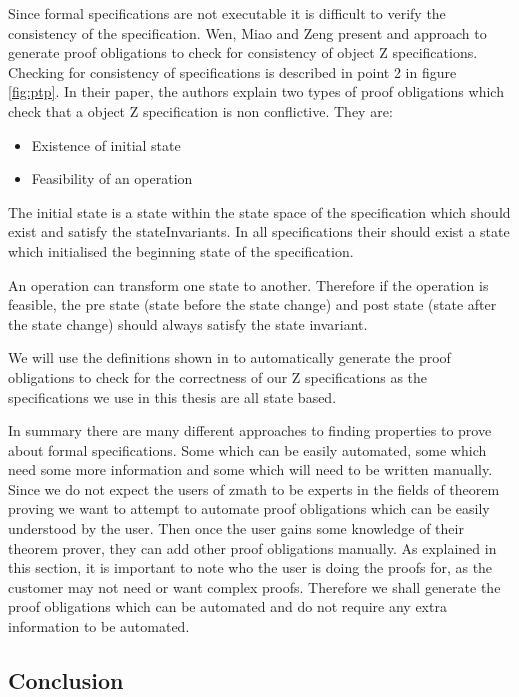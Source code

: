 Since formal specifications are not executable it is difficult to verify the consistency of the specification. Wen, Miao and Zeng \cite{DBLP:conf/icsea/WenMZ06} present and approach to generate proof obligations to check for consistency of object Z specifications. Checking for consistency of specifications is described in point 2 in figure \ref{fig:ptp}. In their paper, the authors explain two 
types of proof obligations which check that a object Z specification is non conflictive. They are:

\begin{itemize}
\item Existence of initial state

\item Feasibility of an operation
\end{itemize}

The initial state is a state within the state space of the specification which should exist and satisfy the stateInvariants. In all specifications their should exist a state which initialised the beginning state of the specification.

An operation can transform one state to another. Therefore if the operation is feasible, the pre state (state before the state change) and post state (state after the state change) should always satisfy the state invariant. 

We will use the definitions shown in \cite{DBLP:conf/icsea/WenMZ06} to automatically generate the proof obligations to check for the correctness of our Z specifications as the specifications we use in this thesis are all state based.

In summary there are many different approaches to finding properties to prove about formal specifications. Some which can be easily automated, some which need some more information and some which will need to be written manually. Since we do not expect the users of \gls{zmath} to be experts in the fields of theorem proving we want to attempt to automate proof obligations which can be easily understood by the user. Then once the user gains some knowledge of their theorem prover, they can add other proof obligations manually. As explained in this section, it is important to note who the user is doing the proofs for, as the customer may not need or want complex proofs. Therefore we shall generate the proof obligations which can be automated and do not require any extra information to be automated.


\subsection{Conclusion}

